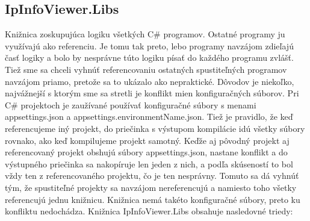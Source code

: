 \subsection{IpInfoViewer.Libs}
Knižnica zoskupujúca logiku všetkých C\# programov. Ostatné programy ju využívajú ako referenciu. Je tomu tak preto, lebo programy navzájom zdieľajú 
časť logiky a bolo by nesprávne túto logiku písať do každého programu zvlášť. Tiež sme sa chceli vyhnúť referencovaniu ostatných spustiteľných programov navzájom 
priamo, pretože sa to ukázalo ako nepraktické. Dôvodov je niekoľko, najvážnejší s ktorým sme sa stretli je konflikt mien konfiguračných súborov. Pri C\# 
projektoch je zaužívané používať konfiguračné súbory s menami appsettings.json a appsettings.{environmentName}.json. Tiež je pravidlo, že keď referencujeme 
iný projekt, do priečinka s výstupom kompilácie idú všetky súbory rovnako, ako keď kompilujeme projekt samotný. Keďže aj pôvodný projekt aj referencovaný projekt 
obshujú súbory appsettings.json, nastane konflikt a do výstupného priečinka sa nakopíruje len jeden z nich, a podľa skúseností to bol vždy ten z referencovaného projektu, 
čo je ten nesprávny. Tomuto sa dá vyhnúť tým, že spustiteľné projekty sa navzájom nereferencujú a namiesto toho všetky referencujú jednu knižnicu. Knižnica nemá takéto 
konfiguračné súbory, preto ku konfliktu nedochádza. Knižnica IpInfoViewer.Libs obsahuje nasledovné triedy: 
